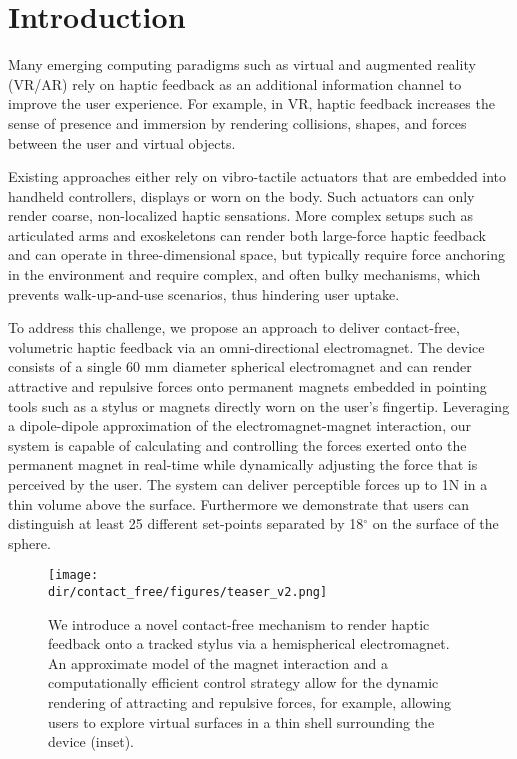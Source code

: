 
\section{Introduction}
Many emerging computing paradigms such as virtual and augmented reality (VR/AR) rely on haptic feedback as an additional information channel to improve the user experience. For example, in VR, haptic feedback increases the sense of presence and immersion by rendering collisions, shapes, and forces between the user and virtual objects.

Existing approaches either rely on vibro-tactile actuators that are embedded into handheld controllers, displays or worn on the body. Such actuators can only render coarse, non-localized haptic sensations. More complex setups such as articulated arms and exoskeletons can render both large-force haptic feedback and can operate in three-dimensional space, but typically require force anchoring in the environment and require complex, and often bulky mechanisms, which prevents walk-up-and-use scenarios, thus hindering user uptake.  

To address this challenge, we propose an approach to deliver contact-free, volumetric haptic feedback via an omni-directional electromagnet. The device consists of a single 60 mm diameter spherical electromagnet and can render attractive and repulsive forces onto permanent magnets embedded in pointing tools such as a stylus or magnets directly worn on the user's fingertip. Leveraging a dipole-dipole approximation of the electromagnet-magnet interaction, our system is capable of calculating and controlling the forces exerted onto the permanent magnet in real-time while dynamically adjusting the force that is perceived by the user. The system can deliver perceptible forces up to 1N in a thin volume above the surface. Furthermore we demonstrate that users can distinguish at least 25 different set-points separated by 18$^\circ$ on the surface of the sphere. %

\begin{figure}[t]
    \centering
    \texttt{[image: \\dir/contact\_free/figures/teaser\_v2.png]}
    \caption{We introduce a novel contact-free mechanism to render haptic feedback onto a tracked stylus via a hemispherical electromagnet. An approximate model of the magnet interaction and a computationally efficient control strategy allow for the dynamic rendering of  attracting and repulsive forces, for example, allowing users to explore virtual surfaces in a thin shell surrounding the device (inset).}
    \label{fig:syst_overview}
\end{figure}{} 

